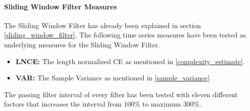 \paragraph{Sliding Window Filter Measures} \label{sliding_window_filter_measures}
The Sliding Window Filter has already been explained in section \ref{sliding_window_filter}. The following time series
measures have been tested as underlying measures for the Sliding Window Filter.

\begin{itemize}
    \item \textbf{LNCE:} The length normalized CE as mentioned in \ref{complexity_estimate}.
    \item \textbf{VAR:} The Sample Variance as mentioned in \ref{sample_variance}.
\end{itemize}
The passing filter interval of every filter has been tested with eleven different factors that increases the interval
from 100\% to maximum 300\%.
